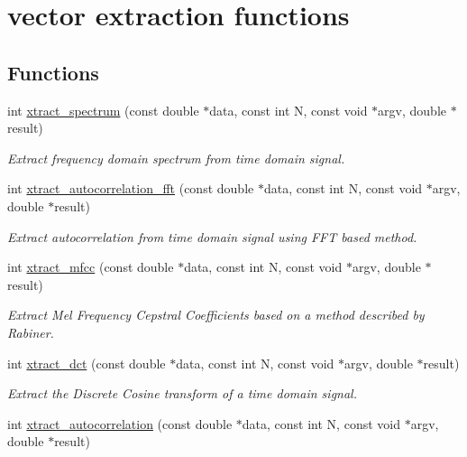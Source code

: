 \hypertarget{group__vector}{\section{vector extraction functions}
\label{group__vector}
}
\subsection*{Functions}
\begin{DoxyCompactItemize}
\item 
int \hyperlink{group__vector_ga768f42db5b7c8bfd910d8d7403517ad6}{xtract\-\_\-spectrum} (const double $\ast$data, const int N, const void $\ast$argv, double $\ast$result)
\begin{DoxyCompactList}\small\item\em Extract frequency domain spectrum from time domain signal. \end{DoxyCompactList}\item 
int \hyperlink{group__vector_ga389a60cc8fbde78c9d52931b8ac985a0}{xtract\-\_\-autocorrelation\-\_\-fft} (const double $\ast$data, const int N, const void $\ast$argv, double $\ast$result)
\begin{DoxyCompactList}\small\item\em Extract autocorrelation from time domain signal using F\-F\-T based method. \end{DoxyCompactList}\item 
int \hyperlink{group__vector_ga5089d464b79c238fe0597bd151728698}{xtract\-\_\-mfcc} (const double $\ast$data, const int N, const void $\ast$argv, double $\ast$result)
\begin{DoxyCompactList}\small\item\em Extract Mel Frequency Cepstral Coefficients based on a method described by Rabiner. \end{DoxyCompactList}\item 
int \hyperlink{group__vector_ga6ee9a1e39ddbe47769cf7fbd67947826}{xtract\-\_\-dct} (const double $\ast$data, const int N, const void $\ast$argv, double $\ast$result)
\begin{DoxyCompactList}\small\item\em Extract the Discrete Cosine transform of a time domain signal. \end{DoxyCompactList}\item 
int \hyperlink{group__vector_ga1900c5b03aa55b843432af37236de0bf}{xtract\-\_\-autocorrelation} (const double $\ast$data, const int N, const void $\ast$argv, double $\ast$result)

\end{DoxyCompactItemize}
